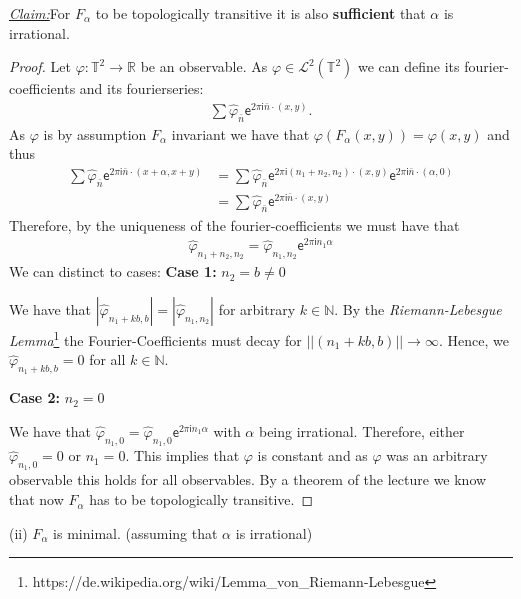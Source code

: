 \documentclass{article}
\newcommand{\claim}{\underline{\textit{Claim:}}\hspace{0,2cm}}
\newcommand{\N}{\mathbb{N}}
\newcommand{\T}[1]{\mathbb{T}^{#1}}
\newcommand{\R}{\mathbb{R}}
\newcommand{\foukof}[1]{\hat{\varphi}_{{#1}}}
\newcommand{\e}[1]{\mathsf{e}^{#1}}
\renewcommand{\i}{\mathsf{i}}
\theoremstyle{definition}
\theoremstyle{plain}
\theoremstyle{remark}
\newcommand{\unteraufgabe}[1]{
	{
		\vspace*{0.2cm}
\noindent\textsf{(#1)}
}
}
\begin{document}
\claim For $F_{\alpha}$ to be topologically transitive it is also \textbf{sufficient} that $\alpha$ is irrational.
\begin{proof}
	Let $\varphi:\T2\rightarrow \R$ be an observable.
	As $\varphi \in \mathcal{L}^2(\T2)$ we can define its fourier-coefficients and its fourierseries:
	\begin{align}
		\sum \hat{\varphi}_{\bar{n}} \e{2\pi\i\bar{n}\cdot(x,y)}.
	\end{align}
	As $\varphi$ is by assumption $F_{\alpha}$ invariant we have that $\varphi(F_{\alpha}(x,y)) =\varphi (x,y)$ and thus
	\begin{align}
		\sum \foukof{\bar{n}}\e{2\pi\i\bar{n}\cdot(x+\alpha,x+y)} 	&= \sum \foukof{\bar{n}}\e{2\pi\i(n_1+n_2,n_2)\cdot(x,y)} \e{2\pi\i\bar{n}\cdot(\alpha,0)} \\
										&= \sum \foukof{\bar{n}}\e{2\pi\i\bar{n}\cdot(x,y)}
	\end{align}
	Therefore, by the uniqueness of the fourier-coefficients we must have that
	\begin{align}
		\foukof{n_1+n_2,n_2} = \foukof{n_1,n_2}\e{2\pi\i n_1\alpha}
	\end{align}
We can distinct to cases:
\textbf{Case 1:} $n_2 = b \neq 0$ 

We have that $|\foukof{n_1 +kb, b}| = |\foukof{n_1,n_2}|$ for arbitrary $k\in \N$. 
By the \emph{Riemann-Lebesgue Lemma}\footnote{https://de.wikipedia.org/wiki/Lemma\_von\_Riemann-Lebesgue} the Fourier-Coefficients must decay for $|| (n_1 + kb, b) || \rightarrow \infty$. Hence, we $\foukof{n_1 + kb ,b} = 0$ for all $k\in \N$.

\noindent \textbf{Case 2:} $n_2 = 0$

We have that $\foukof{n_1,0} = \foukof{n_1,0} \e{2\pi\i n_1\alpha}$ with $\alpha$ being irrational. Therefore, either $\foukof{n_1,0} = 0$ or $n_1 = 0$. 
This implies that $\varphi$ is constant and as $\varphi$ was an arbitrary observable this holds for all observables.  
By a theorem of the lecture we know that now $F_{\alpha}$ has to be topologically transitive.
\end{proof}
\unteraufgabe{ii} $F_{\alpha}$ is minimal. (assuming that $\alpha$ is irrational)
\end{document}
